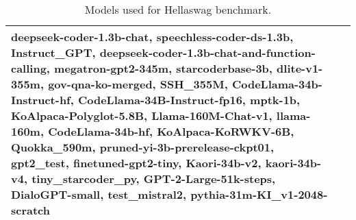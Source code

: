 \begin{table*}[htbp]
\begin{tabular}{p{2cm}p{12cm}}
deepseek-coder-1.3b-chat, speechless-coder-ds-1.3b, Instruct\_GPT, deepseek-coder-1.3b-chat-and-function-calling, megatron-gpt2-345m, starcoderbase-3b, dlite-v1-355m, gov-qna-ko-merged, SSH\_355M, CodeLlama-34b-Instruct-hf, CodeLlama-34B-Instruct-fp16, mptk-1b, KoAlpaca-Polyglot-5.8B, Llama-160M-Chat-v1, llama-160m, CodeLlama-34b-hf, KoAlpaca-KoRWKV-6B, Quokka\_590m, pruned-yi-3b-prerelease-ckpt01, gpt2\_test, finetuned-gpt2-tiny, Kaori-34b-v2, kaori-34b-v4, tiny\_starcoder\_py, GPT-2-Large-51k-steps, DialoGPT-small, test\_mistral2, pythia-31m-KI\_v1-2048-scratch \\
        \bottomrule
    \end{tabular}
    \caption{Models used for Hellaswag benchmark.}
    \label{apdtab:hella-model-list}
\end{table*}


